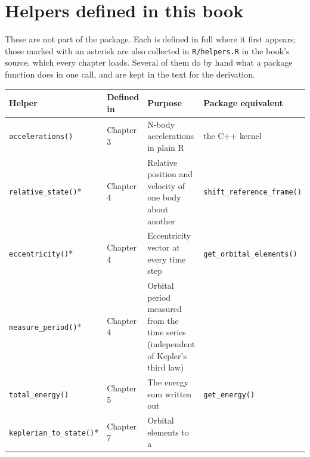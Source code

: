 \documentclass[
  10.5pt,
  letterpaper,
]{scrbook}
\newcounter{none} %
\theoremstyle{definition}
\theoremstyle{plain}
\theoremstyle{remark}
\begin{document}
\section{Helpers defined in this
book}\label{helpers-defined-in-this-book}

These are not part of the package. Each is defined in full where it
first appears; those marked with an asterisk are also collected in
\texttt{R/helpers.R} in the book's source, which every chapter loads.
Several of them do by hand what a package function does in one call, and
are kept in the text for the derivation.

{\def\LTcaptype{none} %
\begin{longtable}[]{@{}
  >{\raggedright\arraybackslash}p{}
  >{\raggedright\arraybackslash}p{}
  >{\raggedright\arraybackslash}p{}
  >{\raggedright\arraybackslash}p{}@{}}
\toprule\noalign{}
\begin{minipage}[b]{\linewidth}\raggedright
Helper
\end{minipage} & \begin{minipage}[b]{\linewidth}\raggedright
Defined in
\end{minipage} & \begin{minipage}[b]{\linewidth}\raggedright
Purpose
\end{minipage} & \begin{minipage}[b]{\linewidth}\raggedright
Package equivalent
\end{minipage} \\
\midrule\noalign{}
\endhead
\bottomrule\noalign{}
\endlastfoot
\texttt{accelerations()} & Chapter 3 & N-body accelerations in plain R &
the C++ kernel \\
\texttt{relative\_state()}* & Chapter 4 & Relative position and velocity
of one body about another & \texttt{shift\_reference\_frame()} \\
\texttt{eccentricity()}* & Chapter 4 & Eccentricity vector at every time
step & \texttt{get\_orbital\_elements()} \\
\texttt{measure\_period()}* & Chapter 4 & Orbital period measured from
the time series (independent of Kepler's third law) & \\
\texttt{total\_energy()} & Chapter 5 & The energy sum written out &
\texttt{get\_energy()} \\
\texttt{keplerian\_to\_state()}* & Chapter 7 & Orbital elements to a

\end{longtable}}
\end{document}
